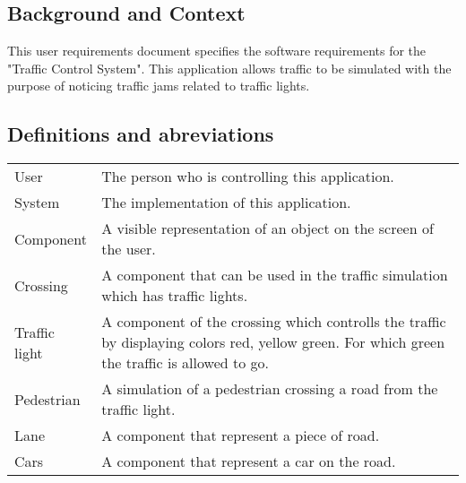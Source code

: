 \documentclass[a4paper,11pt]{article}
\title{\Title}
\author{}
\date{\today}
\begin{document}
\begin{titlepage}
\maketitle
\end{titlepage}

  	\linespread{1.15} %
    
  	\subsection*{Background and Context}
  	This user requirements document specifies the software requirements for the "Traffic Control System". This application allows traffic to be simulated with the purpose of noticing traffic jams related to traffic lights.
  	
  	\subsection*{Definitions and abreviations}
  	\begin{longtable}[l]{p{50pt} p{350pt}} 
  		User & The person who is controlling this application.\\
  		System & The implementation of this application.\\
  		Component & A visible representation of an object on the screen of the user.\\
  		Crossing & A component that can be used in the traffic simulation which has traffic lights.\\
  		Traffic light & A component of the crossing which controlls the traffic by displaying colors red, yellow green. For which green the traffic is allowed to go.\\
  		Pedestrian & A simulation of a pedestrian crossing a road from the traffic light.\\
  		Lane & A component that represent a piece of road.\\
  		Cars & A component that represent a car on the road.\\
  	\end{longtable}
  	
  	\tableofcontents
  	\newpage
  	
  	
  	
    
    
    
    
\end{document}
